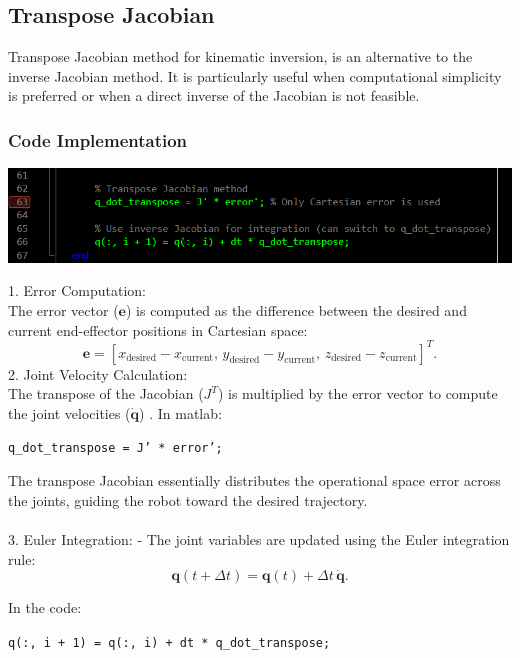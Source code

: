 \documentclass[12pt]{report}
\begin{document}
		\subsection{Transpose Jacobian}
			Transpose Jacobian method for kinematic inversion, is an alternative to the inverse Jacobian method. It is particularly useful when computational simplicity is preferred or when a direct inverse of the Jacobian is not feasible.
		
		
	
		
	\subsubsection{Code Implementation}
		\includegraphics[scale = 1]{TR1}
	
		1. Error Computation:
		\\The error vector (\(\mathbf{e}\)) is computed as the difference between the desired and current end-effector positions in Cartesian space:
		\begin{equation}
		\mathbf{e} = [x_{\text{desired}} - x_{\text{current}}, \, y_{\text{desired}} - y_{\text{current}}, \, z_{\text{desired}} - z_{\text{current}}]^T.
		\end{equation}
		2. Joint Velocity Calculation:\\The transpose of the Jacobian (\(J^T\)) is multiplied by the error vector to compute the joint velocities (\(\dot{\mathbf{q}}\))
		. In matlab:
		\begin{center}
			\texttt{q\_dot\_transpose = J' * error';}
		\end{center}
		
		The transpose Jacobian essentially distributes the operational space error across the joints, guiding the robot toward the desired trajectory.\\\\3. Euler Integration:
		- The joint variables are updated using the Euler integration rule:
		\begin{equation}
			\mathbf{q}(t + \Delta t) = \mathbf{q}(t) + \Delta t \, \dot{\mathbf{q}}.
		\end{equation}
		
		In the code:
	\begin{center}
		\texttt{q(:, i + 1) = q(:, i) + dt * q\_dot\_transpose;}
	\end{center}
\end{document}

